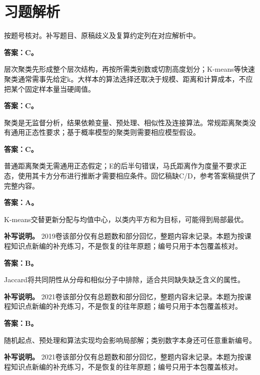 \clearpage\section{习题解析}

\begin{keyidea}[核对方式]按题号核对。补写题目、原稿歧义及复算约定列在对应解析中。\end{keyidea}


\textbf{答案：C。}

层次聚类先形成整个层次结构，再按所需类别数或切割高度划分；K-means等快速聚类通常需事先给定k。大样本的算法选择还取决于规模、距离和计算成本，不应把某个固定样本量当硬阈值。



\textbf{答案：C。}

聚类是无监督分析，结果依赖变量、预处理、相似性及连接算法。常规距离聚类没有通用正态性要求；基于概率模型的聚类则需要相应模型假设。



\textbf{答案：C。}

普通距离聚类无需通用正态假定；E的后半句错误，马氏距离作为度量不要求正态，使用其卡方分布进行推断才需要相应条件。回忆稿缺C/D，参考答案稿提供了完整内容。



\textbf{答案：A。}

K-means交替更新分配与均值中心，以类内平方和为目标，可能得到局部最优。


\textbf{补写说明。} 2019卷该部分仅有总题数和部分回忆，整题内容未记录。本题为按课程知识点新编的补充练习，不是恢复的往年原题；编号只用于本包覆盖核对。



\textbf{答案：B。}

Jaccard将共同阴性从分母和相似分子中排除，适合共同缺失缺乏含义的属性。


\textbf{补写说明。} 2021卷该部分仅有总题数和部分回忆，整题内容未记录。本题为按课程知识点新编的补充练习，不是恢复的往年原题；编号只用于本包覆盖核对。



\textbf{答案：B。}

随机起点、预处理和算法实现均会影响局部解；类别数字本身还可任意重新编号。


\textbf{补写说明。} 2021卷该部分仅有总题数和部分回忆，整题内容未记录。本题为按课程知识点新编的补充练习，不是恢复的往年原题；编号只用于本包覆盖核对。



